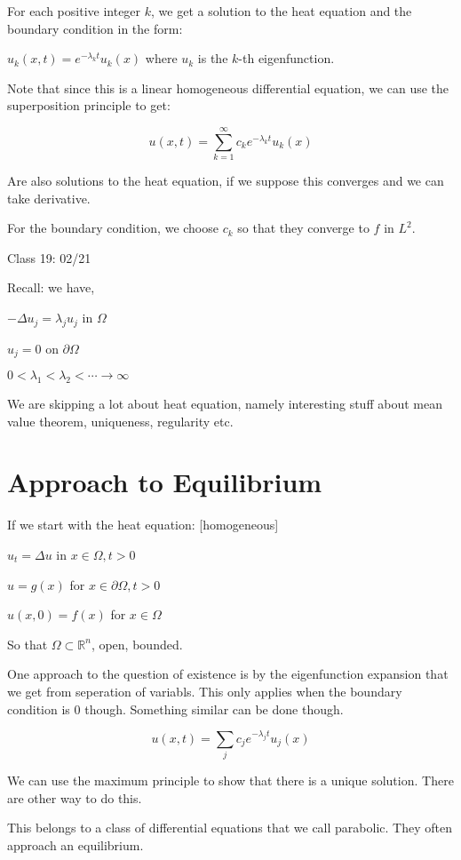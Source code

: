 \documentclass{article}
\theoremstyle{definition}
\begin{document}
For each positive integer \(k\), we get a solution to the heat equation and the boundary condition in the form:

\(\boxed{u_k(x,t)=e^{-\lambda _k t}u_k(x)}\) where \(u_k\) is the \(k\)-th eigenfunction.

Note that since this is a linear homogeneous differential equation, we can use the superposition principle to get:

\[
    \boxed{u(x,t) = \sum_{k=1}^{\infty} c_k e^{-\lambda _k t}u_k (x)}
\]

Are also solutions to the heat equation, if we suppose this converges and we can take derivative.

For the boundary condition, we choose \(c_k\) so that they converge to \(f\) in \(L^2\).

\hrulefill

Class 19: 02/21

Recall: we have,

\(-\Delta u_j = \lambda _j u_j\) in \(\Omega \) 

\(u_j = 0\) on \(\partial \Omega \) 

\(0 < \lambda_1 < \lambda_2 < \cdots \to \infty\) 

We are skipping a lot about heat equation, namely interesting stuff about mean value theorem, uniqueness, regularity etc.

\section*{Approach to Equilibrium}

If we start with the heat equation: [homogeneous]

\(u_t = \Delta u\) in \(x\in\Omega,t>0\) 

\(u = g(x)\) for \(x\in \partial \Omega, t>0\) 

\(u(x,0)=f(x)\) for \(x\in \Omega \) 

So that \(\Omega \subset \mathbb{R}^n\), open, bounded.

One approach to the question of existence is by the eigenfunction expansion that we get from seperation of variabls. This only applies when the boundary condition is \(0\) though. Something similar can be done though.

\[
    u(x,t) = \sum_j c_j e^{-\lambda_j t}u_j(x)
\]

We can use the maximum principle to show that there is a unique solution. There are other way to do this.

This belongs to a class of differential equations that we call parabolic. They often approach an equilibrium.
\end{document}

